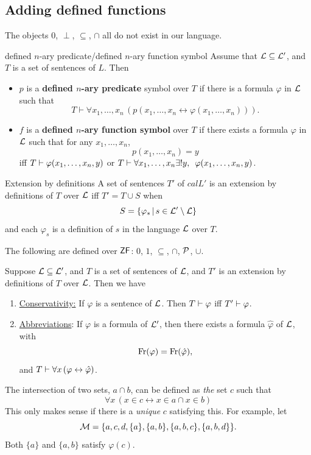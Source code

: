 \documentclass{article}
\begin{document}
\subsection{Adding defined functions}
The objects $0$, $\perp$, $\subseteq$, $\cap$ all do not exist in our language.
\begin{fancydefine*}{defined $n$-ary predicate/defined $n$-ary function symbol}
    Assume that $\mathcal{L} \subseteq \mathcal{L}'$, and $T$ is a set of sentences of $L$. Then \begin{itemize}
        \item $p$ is a \textbf{defined $n$-ary predicate} symbol over $T$ if there is a formula $\varphi$ in $\mathcal{L}$ such that \[ T \vdash \forall x_{1}, \dots, x_{n} \, ( p(x_{1}, \dots, x_{n} \leftrightarrow \varphi(x_{1}, \dots, x_{n}))).\]
        \item $f$ is a \textbf{defined $n$-ary function symbol} over $T$ if there exists a formula $\varphi$ in $\mathcal{L}$ such that for any $x_{1}, \dots, x_{n}$, \[ p(x_{1}, \dots, x_{n}) = y\] iff $T \vdash \varphi(x_{1},\dots, x_{n},y)$ or $T \vdash \forall x_{1}, \dots, x_{n} \exists ! y, \,\,\, \varphi(x_{1} ,\dots, x_{n},y)$.
    \end{itemize}
\end{fancydefine*}
\begin{fancydefine*}{Extension by definitions}
    A set of sentences $T'$ of $calL'$ is an extension by definitions of $T$ over $\mathcal{L}$ iff $T' = T \cup S$ when \[ S = \{ \varphi_{s} \, | \, s \in \mathcal{L}' \setminus \mathcal{L}\}\] and each $\varphi_{s}$ is a definition of $s$ in the language $\mathcal{L}$ over $T$.
\end{fancydefine*}
\begin{fancyprop}{}
    The following are defined over $\mathsf{ZF}$: $0$, $1$, $\subseteq$, $\cap$, $\mathcal{P}$, $\cup$.
\end{fancyprop}
\begin{fancythm*}{}
    Suppose $\mathcal{L} \subseteq \mathcal{L}'$, and $T$ is a set of sentences of $\mathcal{L}$, and $T'$ is an extension by definitions of $T$ over $\mathcal{L}$. Then we have \begin{enumerate}
        \item[(1)] \underline{Conservativity:} If $\varphi$ is a sentence of $\mathcal{L}$. Then $T \vdash \varphi$ iff $T' \vdash \varphi$.
        \item[(2)] \underline{Abbreviations}: If $\varphi$ is a formula of $\mathcal{L}'$, then there exists a formula $\hat{\varphi}$ of $\mathcal{L}$, with \[ \operatorname{Fr}(\varphi) = \operatorname{Fr}(\hat{\varphi}),\] and $T \vdash \forall x \, ( \varphi \leftrightarrow \hat{\varphi})$.
    \end{enumerate}
\end{fancythm*}
\begin{ex*}
    The intersection of two sets, $a \cap b$, can be defined as \textit{the} set $c$ such that \[ \forall x \, (x \in c \leftrightarrow x \in a \cap x \in b)\]
    This only makes sense if there is a \textit{unique} $c$ satisfying this.\gap
    For example, let \[ \mathcal{M} = \{ a,c,d, \{a\}, \{a,b\},\{a,b,c\},\{a,b,d\}\}.\] Both $\{a\}$ and $\{a,b\}$ satisfy $\varphi(c)$.
\end{ex*}
\end{document}
